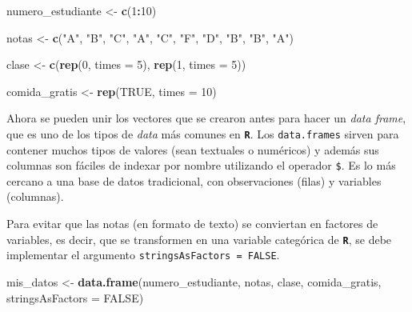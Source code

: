\documentclass[
]{article}
\newenvironment{Shaded}{\begin{snugshade}}{\end{snugshade}}
\newcommand{\AttributeTok}[1]{\textcolor[rgb]{0.13,0.29,0.53}{#1}}
\newcommand{\ConstantTok}[1]{\textcolor[rgb]{0.56,0.35,0.01}{#1}}
\newcommand{\DecValTok}[1]{\textcolor[rgb]{0.00,0.00,0.81}{#1}}
\newcommand{\FunctionTok}[1]{\textcolor[rgb]{0.13,0.29,0.53}{\textbf{#1}}}
\newcommand{\NormalTok}[1]{#1}
\newcommand{\OtherTok}[1]{\textcolor[rgb]{0.56,0.35,0.01}{#1}}
\newcommand{\SpecialCharTok}[1]{\textcolor[rgb]{0.81,0.36,0.00}{\textbf{#1}}}
\newcommand{\StringTok}[1]{\textcolor[rgb]{0.31,0.60,0.02}{#1}}
\begin{document}
\begin{Shaded}
\begin{Highlighting}[]
\NormalTok{numero\_estudiante }\OtherTok{\textless{}{-}} \FunctionTok{c}\NormalTok{(}\DecValTok{1}\SpecialCharTok{:}\DecValTok{10}\NormalTok{)}

\NormalTok{notas }\OtherTok{\textless{}{-}} \FunctionTok{c}\NormalTok{(}\StringTok{"A"}\NormalTok{, }\StringTok{"B"}\NormalTok{, }\StringTok{"C"}\NormalTok{, }\StringTok{"A"}\NormalTok{, }\StringTok{"C"}\NormalTok{, }\StringTok{"F"}\NormalTok{, }\StringTok{"D"}\NormalTok{, }\StringTok{"B"}\NormalTok{, }\StringTok{"B"}\NormalTok{, }\StringTok{"A"}\NormalTok{)}

\NormalTok{clase }\OtherTok{\textless{}{-}} \FunctionTok{c}\NormalTok{(}\FunctionTok{rep}\NormalTok{(}\DecValTok{0}\NormalTok{, }\AttributeTok{times =} \DecValTok{5}\NormalTok{), }\FunctionTok{rep}\NormalTok{(}\DecValTok{1}\NormalTok{, }\AttributeTok{times =} \DecValTok{5}\NormalTok{))}

\NormalTok{comida\_gratis }\OtherTok{\textless{}{-}} \FunctionTok{rep}\NormalTok{(}\ConstantTok{TRUE}\NormalTok{, }\AttributeTok{times =} \DecValTok{10}\NormalTok{)}
\end{Highlighting}
\end{Shaded}

Ahora se pueden unir los vectores que se crearon antes para hacer un \emph{data frame}, que es uno de los tipos de \emph{data} más comunes en \textbf{\texttt{R}}. Los \texttt{data.frames} sirven para contener muchos tipos de valores (sean textuales o numéricos) y además sus columnas son fáciles de indexar por nombre utilizando el operador \texttt{\$}. Es lo más cercano a una base de datos tradicional, con observaciones (filas) y variables (columnas).

Para evitar que las notas (en formato de texto) se conviertan en factores de variables, es decir, que se transformen en una variable categórica de \textbf{\texttt{R}}, se debe implementar el argumento \texttt{stringsAsFactors\ =\ FALSE}.

\begin{Shaded}
\begin{Highlighting}[]
\NormalTok{mis\_datos }\OtherTok{\textless{}{-}} \FunctionTok{data.frame}\NormalTok{(numero\_estudiante, notas, clase, comida\_gratis, }\AttributeTok{stringsAsFactors =} \ConstantTok{FALSE}\NormalTok{)}
\end{Highlighting}
\end{Shaded}
\end{document}
